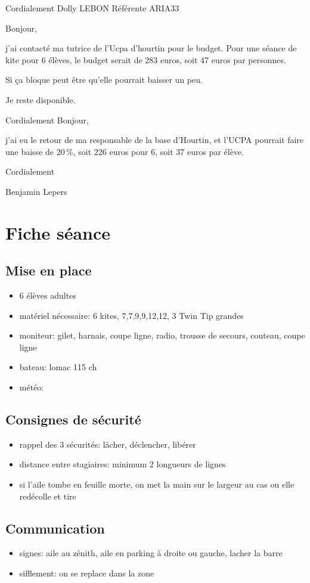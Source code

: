 \documentclass[12pt,a4paper]{report}
\begin{document}
Cordialement
Dolly LEBON
Référente ARIA33

\bigskip
Bonjour,

j'ai contacté ma tutrice de l'Ucpa d'hourtin pour le budget.
Pour une séance de kite  pour 6 élèves, le budget serait de 283 euros,
soit 47 euros par personnes.

Si ça bloque peut être qu'elle pourrait baisser un peu.


Je reste disponible.

Cordialement
\bigskip
Bonjour,

j'ai eu le retour de ma responsable de la base d'Hourtin, et l'UCPA
pourrait faire une baisse de 20\,\%, soit 226 euros pour 6, soit 37 euros
par élève.

Cordialement

Benjamin Lepers
\chapter{Fiche séance\label{fiche_seance}}
\section{Mise en place}
\begin{itemize}
\item 6 élèves adultes
\item matériel nécessaire: 6 kites, 7,7,9,9,12,12, 3 Twin Tip grandes
\item moniteur: gilet, harnais, coupe ligne, radio, trousse de secours, couteau, coupe ligne
\item bateau: lomac 115 ch
\item météo: 
\end{itemize}
\section{Consignes de sécurité}
\begin{itemize}
\item rappel des 3 sécurités: lâcher, déclencher, libérer
\item distance entre stagiaires: minimum 2 longueurs de lignes
\item si l'aile tombe en feuille morte, on met la main sur le largeur au cas ou elle redécolle et tire
\end{itemize}
\section{Communication}
\begin{itemize}
\item signes: aile au zénith, aile en parking à droite ou gauche, lacher la barre
\item sifflement: on se replace dans la zone
\end{itemize}
\end{document}
